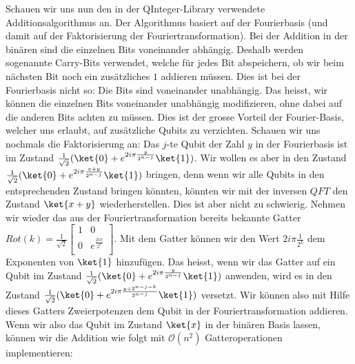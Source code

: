 Schauen wir uns nun den in der QInteger-Library verwendete Additionsalgorithmus an. Der Algorithmus basiert auf der Fourierbasis (und damit auf der Faktorisierung der Fouriertransformation). Bei der Addition in der binären sind die einzelnen Bits voneinander abhängig. Deshalb werden sogenannte Carry-Bits verwendet, welche für jedes Bit abspeichern, ob wir beim nächsten Bit noch ein zusätzliches $1$ addieren müssen. Dies ist bei der Fourierbasis nicht so: Die Bits sind voneinander unabhängig. Das heisst, wir können die einzelnen Bits voneinander unabhängig modifizieren, ohne dabei auf die anderen Bits achten zu müssen. Dies ist der grosse Vorteil der Fourier-Basis, welcher uns erlaubt, auf zusätzliche Qubits zu verzichten. Schauen wir uns nochmals die Faktorisierung an: Das $j$-te Qubit der Zahl $y$ in der Fourierbasis ist im Zustand $\frac{1}{\sqrt{2}}(\ket{0} + e^{2i\pi\frac{y}{2^{n - j}}}\ket{1})$. Wir wollen es aber in den Zustand $\frac{1}{\sqrt{2}}(\ket{0} + e^{2i\pi\frac{x + y}{2^{n - j}}}\ket{1})$ bringen, denn wenn wir alle Qubits in den entsprechenden Zustand bringen könnten, könnten wir mit der inversen $QFT$ den Zustand $\ket{x + y}$ wiederherstellen. Dies ist aber nicht zu schwierig. Nehmen wir wieder das aus der Fouriertransformation bereits bekannte Gatter $Rot(k) = \frac{1}{\sqrt{2}}\begin{bmatrix}
    1 & 0 \\
    0 & e^{\frac{2i\pi}{2^k}} \\
\end{bmatrix}$. Mit dem Gatter können wir den Wert $2i\pi\frac{1}{2^k}$ dem Exponenten von $\ket{1}$ hinzufügen. Das heisst, wenn wir das Gatter auf ein Qubit im Zustand $\frac{1}{\sqrt{2}}(\ket{0} + e^{2i\pi\frac{y}{2^{n - j}}}\ket{1})$ anwenden, wird es in den Zustand $\frac{1}{\sqrt{2}}(\ket{0} + e^{2i\pi\frac{y + 2^{n - j - k}}{2^{n - j}}}\ket{1})$ versetzt. Wir können also mit Hilfe dieses Gatters Zweierpotenzen dem Qubit in der Fouriertransformation addieren. Wenn wir also das Qubit im Zustand $\ket{x}$ in der binären Basis lassen, können wir die Addition wie folgt mit $\mathcal O(n^2)$ Gatteroperationen implementieren:
